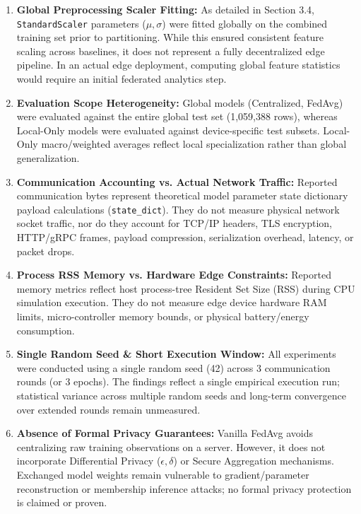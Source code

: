 \documentclass[11pt,a4paper]{article}
\begin{document}
\begin{enumerate}
    \item \textbf{Global Preprocessing Scaler Fitting:} As detailed in Section 3.4, \texttt{StandardScaler} parameters ($\mu, \sigma$) were fitted globally on the combined training set prior to partitioning. While this ensured consistent feature scaling across baselines, it does not represent a fully decentralized edge pipeline. In an actual edge deployment, computing global feature statistics would require an initial federated analytics step.
    \item \textbf{Evaluation Scope Heterogeneity:} Global models (Centralized, FedAvg) were evaluated against the entire global test set (1,059,388 rows), whereas Local-Only models were evaluated against device-specific test subsets. Local-Only macro/weighted averages reflect local specialization rather than global generalization.
    \item \textbf{Communication Accounting vs. Actual Network Traffic:} Reported communication bytes represent theoretical model parameter state dictionary payload calculations (\texttt{state\_dict}). They do not measure physical network socket traffic, nor do they account for TCP/IP headers, TLS encryption, HTTP/gRPC frames, payload compression, serialization overhead, latency, or packet drops.
    \item \textbf{Process RSS Memory vs. Hardware Edge Constraints:} Reported memory metrics reflect host process-tree Resident Set Size (RSS) during CPU simulation execution. They do not measure edge device hardware RAM limits, micro-controller memory bounds, or physical battery/energy consumption.
    \item \textbf{Single Random Seed \& Short Execution Window:} All experiments were conducted using a single random seed (42) across 3 communication rounds (or 3 epochs). The findings reflect a single empirical execution run; statistical variance across multiple random seeds and long-term convergence over extended rounds remain unmeasured.
    \item \textbf{Absence of Formal Privacy Guarantees:} Vanilla FedAvg avoids centralizing raw training observations on a server. However, it does not incorporate Differential Privacy ($\epsilon, \delta$) or Secure Aggregation mechanisms. Exchanged model weights remain vulnerable to gradient/parameter reconstruction or membership inference attacks; no formal privacy protection is claimed or proven.
\end{enumerate}
\end{document}
